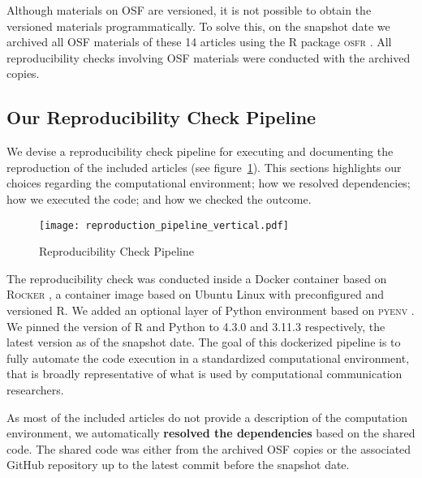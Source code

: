 
Although materials on OSF are versioned, it is not possible to obtain the versioned materials programmatically. To solve this, on the snapshot date we archived all OSF materials of these 14 articles using the R package \textsc{osfr} \parencite[]{osfr}. All reproducibility checks involving OSF materials were conducted with the archived copies.

\subsection{Our Reproducibility Check Pipeline}

We devise a reproducibility check pipeline for executing and documenting the reproduction of the included articles (see figure~\ref{fig:pipeline}).
This sections highlights our choices regarding the computational environment; how we resolved dependencies; how we executed the code; and how we checked the outcome.

\begin{figure}
\texttt{[image: reproduction\_pipeline\_vertical.pdf]}
\caption{Reproducibility Check Pipeline}
\label{fig:pipeline}
\end{figure}

The reproducibility check was conducted inside a Docker container based on \textsc{Rocker} \parencite{boettiger:2017:IR}, a container image based on Ubuntu Linux with preconfigured and versioned R. We added an optional layer of Python environment based on \textsc{pyenv} \parencite{pyenv}. We pinned the version of R and Python to 4.3.0 and 3.11.3 respectively, the latest version as of the snapshot date. The goal of this dockerized pipeline is to fully automate the code execution in a standardized computational environment, that is broadly representative of what is used by computational communication researchers.


As most of the included articles do not provide a description of the computation environment, we automatically \textbf{resolved the dependencies} based on the shared code. The shared code was either from the archived OSF copies or the associated GitHub repository up to the latest commit before the snapshot date.


